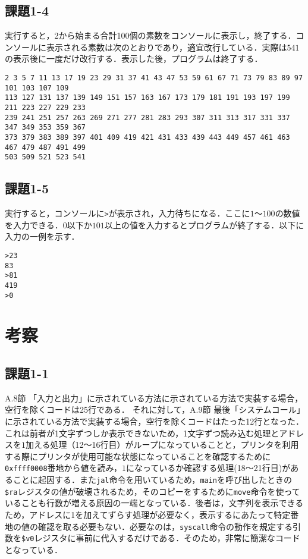 \subsection{課題1-4}
実行すると，2から始まる合計100個の素数をコンソールに表示し，終了する．コンソールに表示される素数は次のとおりであり，適宜改行している．実際は$541$の表示後に一度だけ改行する．表示した後，プログラムは終了する．
\begin{verbatim}
2 3 5 7 11 13 17 19 23 29 31 37 41 43 47 53 59 61 67 71 73 79 83 89 97 101 103 107 109
113 127 131 137 139 149 151 157 163 167 173 179 181 191 193 197 199 211 223 227 229 233
239 241 251 257 263 269 271 277 281 283 293 307 311 313 317 331 337 347 349 353 359 367
373 379 383 389 397 401 409 419 421 431 433 439 443 449 457 461 463 467 479 487 491 499
503 509 521 523 541 
\end{verbatim}

\subsection{課題1-5}
実行すると，コンソールに\verb|>|が表示され，入力待ちになる．ここに$1$～$100$の数値を入力できる．$0$以下か$101$以上の値を入力するとプログラムが終了する．以下に入力の一例を示す．
\begin{verbatim}
>23
83
>81
419
>0
\end{verbatim}

\section{考察} \label{sec:review}

\subsection{課題1-1}
A.8節 「入力と出力」に示されている方法に示されている方法で実装する場合，空行を除くコードは25行である．
それに対して，A.9節 最後「システムコール」に示されている方法で実装する場合，空行を除くコードはたった12行となった．
これは前者が1文字ずつしか表示できないため，1文字ずつ読み込む処理とアドレスを$1$加える処理（12～16行目）がループになっていることと，プリンタを利用する際にプリンタが使用可能な状態になっていることを確認するために\verb|0xffff0008|番地から値を読み，$1$になっているか確認する処理(18～21行目)があることに起因する．また\verb|jal|命令を用いているため，\verb|main|を呼び出したときの\verb|$ra|レジスタの値が破壊されるため，そのコピーをするために\verb|move|命令を使っていることも行数が増える原因の一端となっている．後者は，文字列を表示できるため，アドレスに1を加えてずらす処理が必要なく，表示するにあたって特定番地の値の確認を取る必要もない．必要なのは，\verb|syscall|命令の動作を規定する引数を\verb|$v0|レジスタに事前に代入するだけである．そのため，非常に簡潔なコードとなっている．

